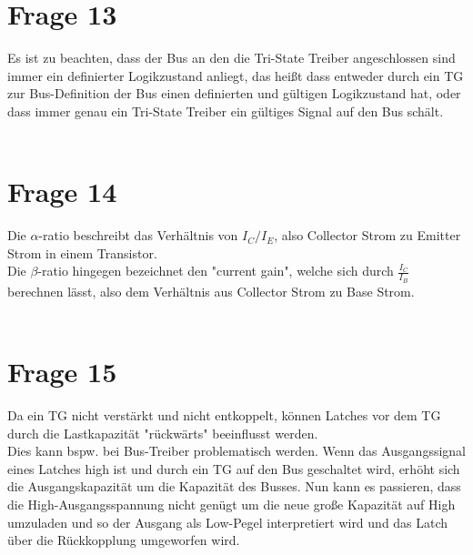 \documentclass[a4paper]{scrartcl}
\begin{document}
\section*{Frage 13}
Es ist zu beachten, dass der Bus an den die Tri-State Treiber angeschlossen sind immer ein definierter Logikzustand anliegt, das heißt dass entweder durch ein TG zur Bus-Definition der Bus einen definierten und gültigen Logikzustand hat, oder dass immer genau ein Tri-State Treiber ein gültiges Signal auf den Bus schält.
~\\
~\\
\section*{Frage 14}
Die $\alpha$-ratio beschreibt das Verhältnis von $I_C/I_E$, also Collector Strom zu Emitter Strom in einem Transistor.\\
Die $\beta$-ratio hingegen bezeichnet den "current gain", welche sich durch $\frac{I_C}{I_B}$ berechnen lässt, also dem Verhältnis aus Collector Strom zu Base Strom.
~\\
~\\
\section*{Frage 15}
Da ein TG nicht verstärkt und nicht entkoppelt, können Latches vor dem TG durch die Lastkapazität "rückwärts" beeinflusst werden.\\
Dies kann bspw. bei Bus-Treiber problematisch werden. Wenn das Ausgangssignal eines Latches high ist und durch ein TG auf den Bus geschaltet wird, erhöht sich die Ausgangskapazität um die Kapazität des Busses. Nun kann es passieren, dass die High-Ausgangsspannung nicht genügt um die neue große Kapazität auf High umzuladen und so der Ausgang als Low-Pegel interpretiert wird und das Latch über die Rückkopplung umgeworfen wird.
~\\
~\\
\end{document}
